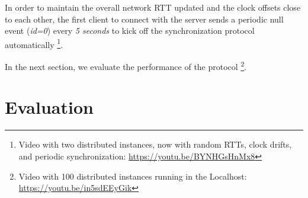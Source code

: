 \documentclass[sigplan,screen]{acmart}
\begin{document}
In order to maintain the overall network RTT updated and the clock offsets
close to each other, the first client to connect with the server sends a
periodic null event (\emph{id=0}) every \emph{5 seconds} to kick off the
synchronization protocol automatically%
\footnote {
    Video with two distributed instances, now with random RTTs, clock drifts,
    and periodic synchronization:
    \url{https://youtu.be/BYNHGsHnMx8}
}.

In the next section, we evaluate the performance of the protocol%
\footnote {
    Video with 100 distributed instances running in the Localhost:
    \url{https://youtu.be/in5sdEEyGik}
}.

\section{Evaluation}
\label{sec.eval}
\end{document}

